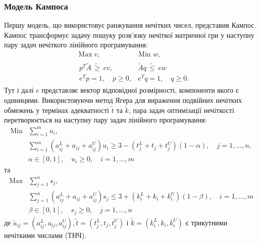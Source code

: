 \documentclass[14pt, a4paper, oneside]{extarticle}
\numberwithin{equation}{section}
\newcommand{\geqslant}{\geq}
\newcommand{\leqslant}{\leq}
\begin{document}
\subsubsection{Модель Кампоса}
Першу модель, що використовує ранжування нечітких чисел, представив Кампос. Кампос трансформує задачу пошуку розв'язку нечіткої матричної гри у наступну пару задач нечіткого лінійного програмування:
\begin{equation*}
\begin{aligned}
& \operatorname{Max} v, \qquad \qquad \quad \text { Min } w , \\
& \begin{array}{ll}p^{T} \tilde{A} \, \tilde{\geqslant} \, e v , & \tilde{A} q \,\tilde{\leqslant}\, e w \\e^{T} p=1, \quad  p \geqslant 0 , & e^{T} q=1, \quad q \geqslant 0 .\end{array}
\end{aligned}
\end{equation*}
Тут і далі $e$ представляє вектор відповідної розмірності, компоненти якого є одиницями. Використовуючи метод Ягера для вираження подвійних нечітких обмежень у термінах адекватності $\tilde{t}$ та $\tilde{k}$, пара задач оптимізації нечіткості перетворюється на наступну пару задач лінійного програмування:
\begin{equation*}
\begin{aligned}
\operatorname{Min} & \sum_{i=1}^{m} u_{i} , \\
& \sum_{i=1}^{m}\left(a_{i j}^{L}+a_{i j}+a_{i j}^{U}\right) u_{i} \geqslant 3-\left(t_{j}^{L}+t_{j}+t_{j}^{U}\right)(1-\alpha), \quad j=1, \ldots, n, \\
& \alpha \in[0,1], \quad u_{i} \geqslant 0, \quad i=1, \ldots, m
\end{aligned}
\end{equation*}
та
\begin{equation*}
\begin{aligned}
\operatorname{Max} & \sum_{j=1}^{n} s_{j} , \\
& \sum_{j=1}^{n}\left(a_{i j}^{L}+a_{i j}+a_{i j}^{U}\right) s_{j} \leqslant 3+\left(k_{i}^{L}+k_{i}+k_{i}^{U}\right)(1-\beta), \quad i=1, \ldots, m \\
& \beta \in[0,1], \quad s_{j} \geqslant 0, \quad j=1, \ldots, n
\end{aligned}
\end{equation*}
де $\tilde{a}_{i j}=\left(a_{i j}^{L}, a_{i j}, a_{i j}^{U}\right), \tilde{t}=\left(t_{j}^{L}, t_{j}, t_{j}^{U}\right)$ і $\tilde{k}=\left(k_{i}^{L}, k_{i}, k_{i}^{U}\right)$ є трикутними нечіткими числами (ТНЧ).
\end{document}
